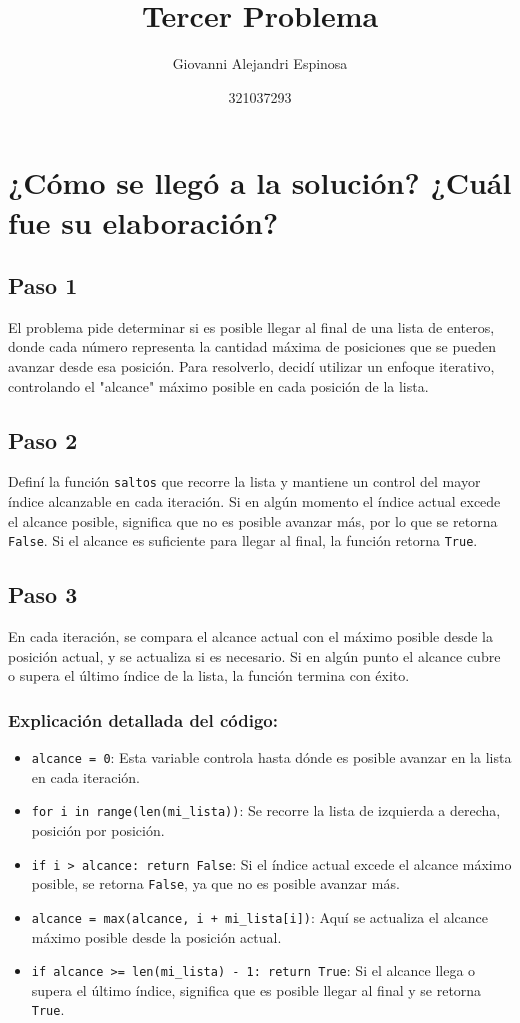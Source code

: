 \documentclass{article}
\title{Tercer Problema}
\author{Giovanni Alejandri Espinosa}
\date{321037293}
\begin{document}
\maketitle

\section*{¿Cómo se llegó a la solución? ¿Cuál fue su elaboración?}

\subsection*{Paso 1}
El problema pide determinar si es posible llegar al final de una lista de enteros, donde cada número representa la cantidad máxima de posiciones que se pueden avanzar desde esa posición. Para resolverlo, decidí utilizar un enfoque iterativo, controlando el "alcance" máximo posible en cada posición de la lista.

\subsection*{Paso 2}
Definí la función \texttt{saltos} que recorre la lista y mantiene un control del mayor índice alcanzable en cada iteración. Si en algún momento el índice actual excede el alcance posible, significa que no es posible avanzar más, por lo que se retorna \texttt{False}. Si el alcance es suficiente para llegar al final, la función retorna \texttt{True}.

\subsection*{Paso 3}
En cada iteración, se compara el alcance actual con el máximo posible desde la posición actual, y se actualiza si es necesario. Si en algún punto el alcance cubre o supera el último índice de la lista, la función termina con éxito.

\subsubsection*{Explicación detallada del código:}
\begin{itemize}
    \item \texttt{alcance = 0}: Esta variable controla hasta dónde es posible avanzar en la lista en cada iteración.
    \item \texttt{for i in range(len(mi_lista))}: Se recorre la lista de izquierda a derecha, posición por posición.
    \item \texttt{if i > alcance: return False}: Si el índice actual excede el alcance máximo posible, se retorna \texttt{False}, ya que no es posible avanzar más.
    \item \texttt{alcance = max(alcance, i + mi_lista[i])}: Aquí se actualiza el alcance máximo posible desde la posición actual.
    \item \texttt{if alcance >= len(mi_lista) - 1: return True}: Si el alcance llega o supera el último índice, significa que es posible llegar al final y se retorna \texttt{True}.
\end{itemize}
\end{document}
